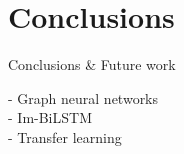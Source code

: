 \chapter{Conclusions}

Conclusions \& Future work

- Graph neural networks\\
- Im-BiLSTM\\
- Transfer learning\\
